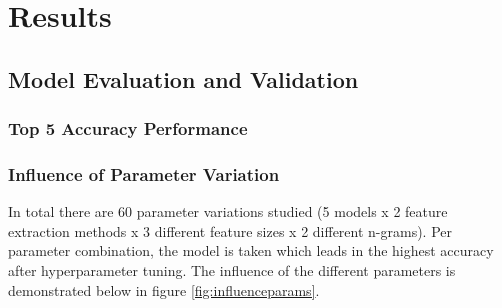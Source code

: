 \documentclass[a4paper,12pt,nottoc]{article}
\begin{document}
\section{Results}

\subsection{Model Evaluation and Validation}

\subsubsection{Top 5 Accuracy Performance}

\subsubsection{Influence of Parameter Variation}

In total there are 60 parameter variations studied (5 models x 2 feature extraction methods x 3 different feature sizes x 2 different n-grams). Per parameter combination, the model is taken which leads in the highest accuracy after hyperparameter tuning. The influence of the different parameters is demonstrated below in figure \ref{fig:influenceparams}.
\end{document}
